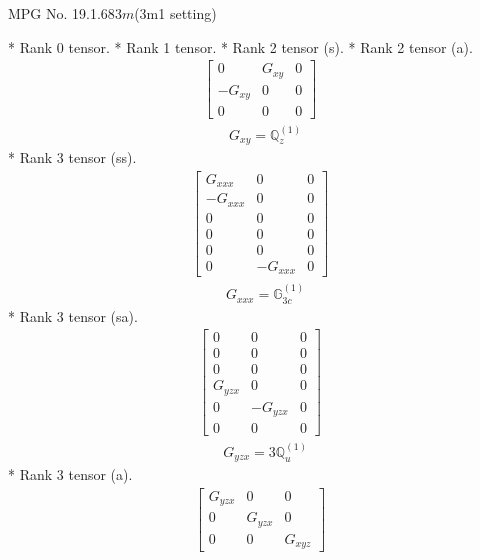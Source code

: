 \documentclass[fleqn,8pt,landscape]{jsarticle}
\begin{document}
\setcounter{MaxMatrixCols}{32}

\renewcommand{\tablename}{Table~}
\renewcommand{\figurename}{Figure~}
\begin{center}
\LARGE
MPG No. 19.1.68\quad$3m$\quad(3m1 setting)
\end{center}
* Rank 0 tensor.
* Rank 1 tensor.
* Rank 2 tensor (s).
* Rank 2 tensor (a).
\begin{align*}
\begin{bmatrix} 0 & G_{xy} & 0 \\ - G_{xy} & 0 & 0 \\ 0 & 0 & 0 \end{bmatrix}
\end{align*}
\begin{align*}
& G_{xy} = \mathbb{Q}_{z}^{(1)}
\end{align*}
* Rank 3 tensor (ss).
\begin{align*}
\begin{bmatrix} G_{xxx} & 0 & 0 \\ - G_{xxx} & 0 & 0 \\ 0 & 0 & 0 \\ 0 & 0 & 0 \\ 0 & 0 & 0 \\ 0 & - G_{xxx} & 0 \end{bmatrix}
\end{align*}
\begin{align*}
& G_{xxx} = \mathbb{G}_{3c}^{(1)}
\end{align*}
* Rank 3 tensor (sa).
\begin{align*}
\begin{bmatrix} 0 & 0 & 0 \\ 0 & 0 & 0 \\ 0 & 0 & 0 \\ G_{yzx} & 0 & 0 \\ 0 & - G_{yzx} & 0 \\ 0 & 0 & 0 \end{bmatrix}
\end{align*}
\begin{align*}
& G_{yzx} = 3 \mathbb{Q}_{u}^{(1)}
\end{align*}
* Rank 3 tensor (a).
\begin{align*}
\begin{bmatrix} G_{yzx} & 0 & 0 \\ 0 & G_{yzx} & 0 \\ 0 & 0 & G_{xyz} \end{bmatrix}
\end{align*}
\end{document}
